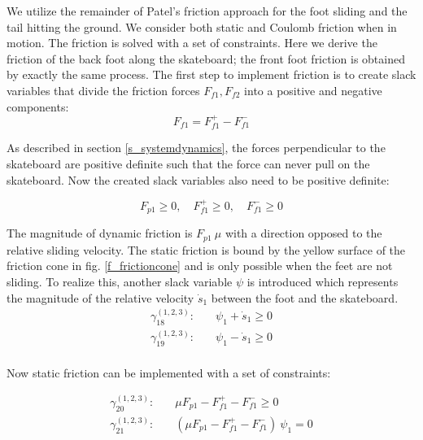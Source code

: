 \documentclass[default,iicol]{sn-jnl}
\begin{document}
We utilize the remainder of Patel's friction approach for the foot sliding and
the tail hitting the ground. We consider both static and Coulomb friction when
in motion.
The friction is solved with a set of constraints.
Here we derive the friction of the back foot along the skateboard; the front
foot friction is obtained by exactly the same process.
The first step to implement friction is to create slack variables that divide
the friction forces $F_{f1},F_{f2}$ into a positive and negative components:
%
\begin{equation} \label{e_plusminfric}
   F_{f1} = F_{f1}^+ - F_{f1}^-
\end{equation}

As described in section \ref{s_systemdynamics}, the forces perpendicular to the
skateboard are positive definite such that the force can never pull on the
skateboard. Now the created slack variables also need to be positive definite:

\begin{equation}
    F_{p1} \geq 0,\quad F_{f1}^+ \geq 0,\quad F_{f1}^- \geq 0
\end{equation}

The magnitude of dynamic friction is $F_{p1}\ \mu$ with a direction opposed to
the relative sliding velocity.
The static friction is bound by the yellow surface of the friction cone in fig.
\ref{f_frictioncone} and is only possible when the feet are not sliding.
To realize this, another slack variable $\psi$ is introduced which represents
the magnitude of the relative velocity $\dot s_1$ between the foot and the
skateboard.
%
\begin{equation}
\begin{split}
    \gamma_{18}^{(1,2,3)}: \quad & \psi_1 + \dot s_1  \geq 0 \\
    \gamma_{19}^{(1,2,3)}: \quad & \psi_1 - \dot s_1  \geq 0 \\
\end{split}
\end{equation}

Now static friction can be implemented with a set of constraints:

\begin{equation}
\begin{split}\label{e_frictioncontrol}
       \gamma_{20}^{(1,2,3)}: \quad & \mu F_{p1} - F_{f1}^+ - F_{f1}^- \geq 0 \\
       \gamma_{21}^{(1,2,3)}: \quad & (\mu F_{p1} - F_{f1}^+ - F_{f1}^-)\ \psi_1  = 0
\end{split}
\end{equation}
\end{document}
